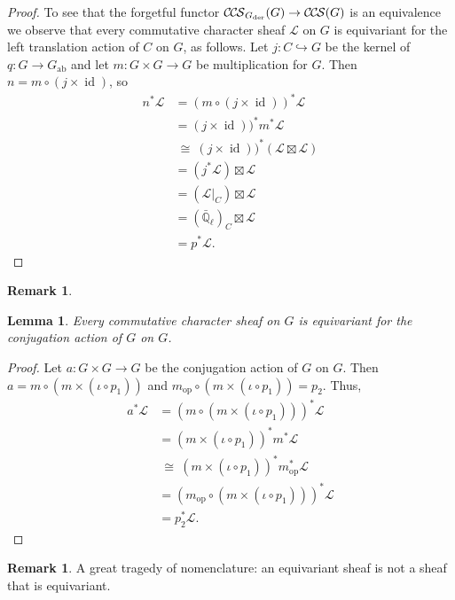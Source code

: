 \documentclass[10pt]{amsart}
\theoremstyle{plain}
\newtheorem{lemma}[theorem]{Lemma}
\theoremstyle{definition}
\newtheorem{remark}[theorem]{Remark}
\newcommand{\EE}{\mathbb{\bar Q}_\ell}
\DeclareMathOperator{\id}{id}
\newcommand{\op}{_{\operatorname{op}}}
\newcommand{\der}{_{\operatorname{der}}}
\newcommand{\ab}{_{\operatorname{ab}}}
\newcommand{\iso}{{\ \cong\ }}
\newcommand{\cs}[1]{{\mathcal{#1}}}
\newcommand{\CCS}{{\mathcal{C\hskip-.8pt C\hskip-0.8pt S}}}
\begin{document}
\begin{proof}
To see that the forgetful functor $\CCS_{G\der}(G) \to \CCS(G)$ is an equivalence we observe that
every commutative character sheaf $\cs{L}$ on $G$ is equivariant for the left translation action of $C$ on $G$, as follows.
Let $j : C \hookrightarrow G$ be the kernel of $q : G \to G\ab$ and let $m : G\times G \to G$ be multiplication for $G$. 
Then $n = m \circ (j \times \id)$, so
\begin{align*}
n^* \cs{L} 
&= (m \circ (j \times \id))^* \cs{L}\\
&= (j \times \id))^* m^*\cs{L}\\
&\iso (j \times \id))^* (\cs{L} \boxtimes \cs{L})\\
&= (j^*\cs{L}) \boxtimes \cs{L}\\
&= (\cs{L}\vert_C) \boxtimes \cs{L}\\
&= (\EE)_C \boxtimes \cs{L}\\
&= p^* \cs{L}.
\end{align*}
 
\end{proof}

\begin{remark}\label{rem:descent}
\end{remark}

\begin{lemma}
Every commutative character sheaf on $G$ is equivariant for the conjugation action of $G$ on $G$.
\end{lemma}

\begin{proof}
Let $a : G \times G \to G$ be the conjugation action of $G$ on $G$. Then $a = m \circ (m \times (\iota \circ p_1))$ and $m\op \circ (m \times (\iota \circ p_1)) = p_2$. Thus,
\begin{align*}
a^* \cs{L} 
&= (m \circ (m \times (\iota \circ p_1)))^* \cs{L}\\
&= (m \times (\iota \circ p_1))^* m^* \cs{L}\\
&\iso (m \times (\iota \circ p_1))^* m\op^* \cs{L}\\
&= (m\op \circ (m \times (\iota \circ p_1)))^* \cs{L}\\
&= p_2^*\cs{L}.
\end{align*}
\end{proof}
 
\begin{remark}
A great tragedy of nomenclature: an equivariant sheaf is not a sheaf that is equivariant.  
\end{remark}
\end{document}
